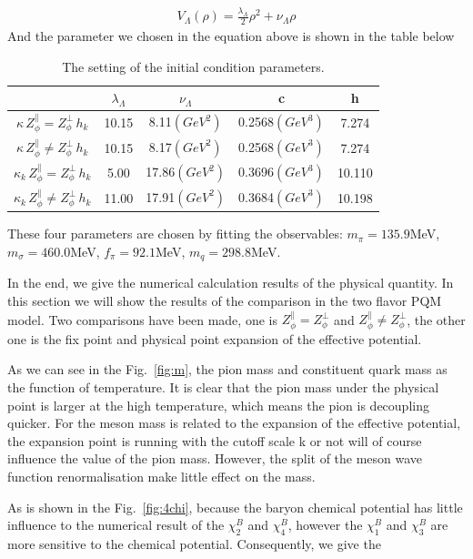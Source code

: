 \documentclass[%
reprint,
superscriptaddress,
showpacs,preprintnumbers,
 amsmath,amssymb,
 aps,
prd,
]{revtex4-1}
\def\Fig#1{Fig.~\ref{#1}} \def\Tab#1{Tab.~\ref{#1}}
\begin{document}
\begin{align}
V_\Lambda(\rho)=\frac{\lambda_\Lambda}{2}\rho^2+\nu_\Lambda\rho
\end{align}
And the parameter we chosen in the equation above is shown in the table below
\begin{table}[h]
\begin{tabular}{ccccc}
\hline
 &$\lambda_\Lambda$& $\nu_\Lambda$ & c & h \\
\hline
 $\kappa\,Z^{\|}_{\phi}=Z^{\bot}_{\phi}\,h_k$& 10.15 & 8.11$(GeV^2)$ & 0.2568$(GeV^3)$ & 7.274\\
 $\kappa\,Z^{\|}_{\phi}\neq Z^{\bot}_{\phi}\,h_k$& 10.15 & 8.17$(GeV^2)$ & 0.2568$(GeV^3)$ & 7.274\\
 $\kappa_k\,Z^{\|}_{\phi}=Z^{\bot}_{\phi}\,h_k$& 5.00 & 17.86$(GeV^2)$ & 0.3696$(GeV^3)$ & 10.110\\
 $\kappa_k\,Z^{\|}_{\phi}\neq Z^{\bot}_{\phi}\,h_k$& 11.00 & 17.91$(GeV^2)$ & 0.3684$(GeV^3)$ & 10.198\\
 
 
\hline
\end{tabular}
 \caption{The setting of the initial condition parameters.}
  \label{tab:para}
\end{table}
These four parameters are chosen by fitting the observables: $m_\pi=135.9$MeV, $m_\sigma=460.0$MeV, $f_\pi=92.1$MeV, $m_q=298.8$MeV.\par
In the end, we give the numerical calculation results of the physical quantity. In this section we will show the results of the comparison in the two flavor PQM model. 
Two comparisons have been made, one is $Z^{\|}_{\phi}=Z^{\bot}_{\phi}$ and $Z^{\|}_{\phi}\neq Z^{\bot}_{\phi}$, the other one is the fix point and physical 
point expansion of the effective potential. \par
As we can see in the \Fig{fig:m}, the pion mass and constituent quark mass as the function of temperature. It is clear that the pion mass under the physical point 
is larger at the high temperature, which means the pion is decoupling quicker. For the meson mass is related to the expansion of the effective potential, the expansion point is 
running with the cutoff scale k or not 
will of course influence the value of the pion mass. However, the split of the meson wave function renormalisation make little effect on the mass.\par
As is shown in the \Fig{fig:4chi}, because the baryon chemical potential has little influence to the numerical result of 
the $\chi^{B}_{2}$ and $\chi^{B}_{4}$, however the $\chi^{B}_{1}$ and $\chi^{B}_{3}$ are more sensitive to the chemical potential. Consequently, we give the 
\end{document}
